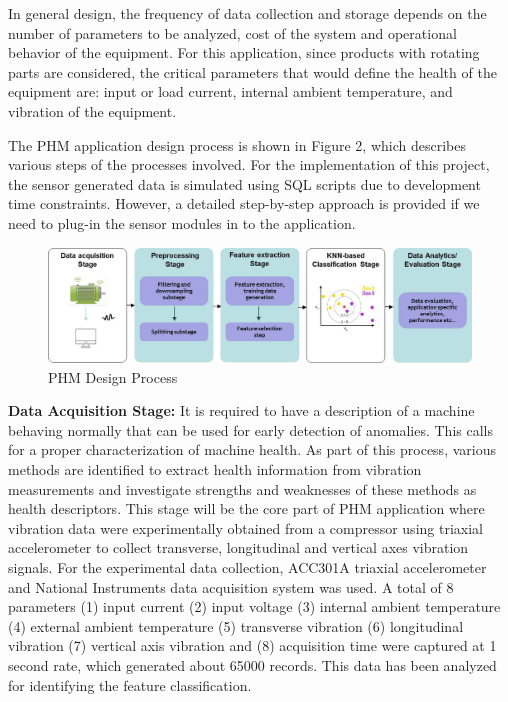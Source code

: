 \documentclass[sigconf]{acmart}
\begin{document}
In general design, the frequency of data collection and storage depends on the number of parameters to be analyzed, cost of the system and operational behavior of the equipment. For this application, since products with rotating parts are considered, the critical parameters that would define the health of the equipment are: input or load current, internal ambient temperature, and vibration of the equipment.

The PHM application design process is shown in Figure 2, which describes various steps of the processes involved. For the implementation of this project, the sensor generated data is simulated using SQL scripts due to development time constraints. However, a detailed step-by-step approach is provided if we need to plug-in the sensor modules in to the application.



\begin{figure}
\includegraphics[width=1.0\columnwidth]{images/phm_process_1}
\caption{PHM Design Process} \label{fig:Figure2}
\end{figure}



\textbf{Data Acquisition Stage:} It is required to have a description of a machine behaving normally that can be used for
early detection of anomalies. This calls for a proper characterization of machine health. As part of this process, various methods are identified to extract health information from vibration measurements and investigate strengths and weaknesses of these methods as health descriptors. This stage will be the core part of PHM application where vibration data were experimentally obtained from a compressor using triaxial accelerometer to collect transverse, longitudinal and vertical axes vibration signals. For the experimental data collection, ACC301A triaxial accelerometer and National Instruments data acquisition system was used. A total of 8 parameters (1) input current (2) input voltage (3) internal ambient temperature (4) external ambient temperature (5) transverse vibration (6) longitudinal vibration (7) vertical axis vibration and (8) acquisition time were captured at 1 second rate, which generated about 65000 records. This data has been analyzed for identifying the feature classification.
\end{document}
